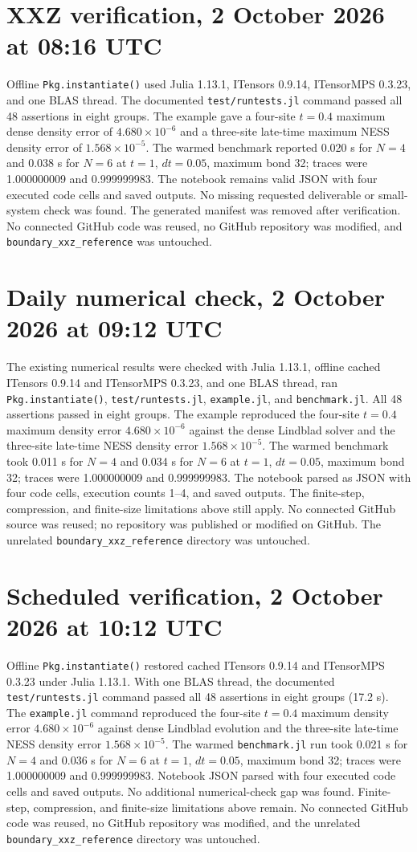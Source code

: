 \documentclass[11pt]{article}
\begin{document}
\section*{XXZ verification, 2 October 2026 at 08:16 UTC}
Offline \texttt{Pkg.instantiate()} used Julia 1.13.1,
ITensors 0.9.14, ITensorMPS 0.3.23, and one BLAS thread. The documented
\texttt{test/runtests.jl} command passed all 48 assertions in eight groups.
The example gave a four-site $t=0.4$ maximum dense density error of
$4.680\times10^{-6}$ and a three-site late-time maximum NESS density
error of $1.568\times10^{-5}$. The warmed benchmark reported 0.020 s
for $N=4$ and 0.038 s for $N=6$ at $t=1$, $dt=0.05$, maximum bond 32;
traces were 1.000000009 and 0.999999983. The notebook remains valid JSON
with four executed code cells and saved outputs. No missing requested
deliverable or small-system check was found. The generated manifest was
removed after verification. No connected GitHub code was reused, no
GitHub repository was modified, and \texttt{boundary\_xxz\_reference}
was untouched.
\section*{Daily numerical check, 2 October 2026 at 09:12 UTC}
The existing numerical results were checked with Julia
1.13.1, offline cached ITensors 0.9.14 and ITensorMPS 0.3.23, and one BLAS
thread, ran \texttt{Pkg.instantiate()}, \texttt{test/runtests.jl},
\texttt{example.jl}, and \texttt{benchmark.jl}. All 48 assertions passed
in eight groups. The example reproduced the four-site $t=0.4$ maximum
density error $4.680\times10^{-6}$ against the dense Lindblad solver and
the three-site late-time NESS density error $1.568\times10^{-5}$.
The warmed benchmark took 0.011 s for $N=4$ and 0.034 s for $N=6$
at $t=1$, $dt=0.05$, maximum bond 32; traces were 1.000000009 and
0.999999983. The notebook parsed as JSON with four code cells, execution
counts 1--4, and saved outputs. The finite-step, compression, and
finite-size limitations above still apply. No connected GitHub source was
reused; no repository was published or modified on GitHub. The unrelated
\texttt{boundary\_xxz\_reference} directory was untouched.
\section*{Scheduled verification, 2 October 2026 at 10:12 UTC}
Offline
\texttt{Pkg.instantiate()} restored cached ITensors 0.9.14 and
ITensorMPS 0.3.23 under Julia 1.13.1. With one BLAS thread, the
documented \texttt{test/runtests.jl} command passed all 48 assertions
in eight groups (17.2 s). The \texttt{example.jl} command reproduced
the four-site $t=0.4$ maximum density error $4.680\times10^{-6}$
against dense Lindblad evolution and the three-site late-time NESS
density error $1.568\times10^{-5}$. The warmed \texttt{benchmark.jl}
run took 0.021 s for $N=4$ and 0.036 s for $N=6$ at $t=1$, $dt=0.05$,
maximum bond 32; traces were 1.000000009 and 0.999999983. Notebook
JSON parsed with four executed code cells and saved outputs. No
additional numerical-check gap was found. Finite-step, compression,
and finite-size limitations above remain. No connected GitHub code was
reused, no GitHub repository was modified, and the unrelated
\texttt{boundary\_xxz\_reference} directory was untouched.
\end{document}
